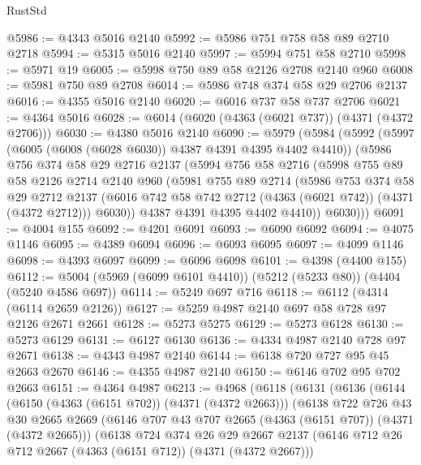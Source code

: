 \begin{lexlean}{RustStd}
\begin{coremodule}
@5986 := @4343 @5016 @2140
@5992 := @5986 @751 @758 @58 @89 @2710 @2718
@5994 := @5315 @5016 @2140
@5997 := @5994 @751 @58 @2710
@5998 := @5971 @19
@6005 := @5998 @750 @89 @58 @2126 @2708 @2140 @960
@6008 := @5981 @750 @89 @2708
@6014 := @5986 @748 @374 @58 @29 @2706 @2137
@6016 := @4355 @5016 @2140
@6020 := @6016 @737 @58 @737 @2706
@6021 := @4364 @5016
@6028 := @6014 (@6020 (@4363 (@6021 @737)) (@4371 (@4372 @2706)))
@6030 := @4380 @5016 @2140
@6090 := @5979
    (@5984
      (@5992
        (@5997 (@6005 (@6008 (@6028 @6030)) @4387 @4391 @4395 @4402 @4410))
        (@5986
          @756
          @374
          @58
          @29
          @2716
          @2137
          (@5994
            @756
            @58
            @2716
            (@5998
              @755
              @89
              @58
              @2126
              @2714
              @2140
              @960
              (@5981
                @755
                @89
                @2714
                (@5986
                  @753
                  @374
                  @58
                  @29
                  @2712
                  @2137
                  (@6016 @742 @58 @742 @2712 (@4363 (@6021 @742)) (@4371 (@4372 @2712)))
                  @6030))
              @4387
              @4391
              @4395
              @4402
              @4410))
          @6030)))
@6091 := @4004 @155
@6092 := @4201 @6091
@6093 := @6090 @6092
@6094 := @4075 @1146
@6095 := @4389 @6094
@6096 := @6093 @6095
@6097 := @4099 @1146
@6098 := @4393 @6097
@6099 := @6096 @6098
@6101 := @4398 (@4400 @155)
@6112 := @5004 (@5969 (@6099 @6101 @4410)) (@5212 (@5233 @80)) (@4404 (@5240 @4586 @697))
@6114 := @5249 @697 @716
@6118 := @6112 (@4314 (@6114 @2659 @2126))
@6127 := @5259 @4987 @2140 @697 @58 @728 @97 @2126 @2671 @2661
@6128 := @5273 @5275
@6129 := @5273 @6128
@6130 := @5273 @6129
@6131 := @6127 @6130
@6136 := @4334 @4987 @2140 @728 @97 @2671
@6138 := @4343 @4987 @2140
@6144 := @6138 @720 @727 @95 @45 @2663 @2670
@6146 := @4355 @4987 @2140
@6150 := @6146 @702 @95 @702 @2663
@6151 := @4364 @4987
@6213 := @4968
    (@6118
      (@6131
        (@6136
          (@6144
            (@6150 (@4363 (@6151 @702)) (@4371 (@4372 @2663)))
            (@6138
              @722
              @726
              @43
              @30
              @2665
              @2669
              (@6146 @707 @43 @707 @2665 (@4363 (@6151 @707)) (@4371 (@4372 @2665)))
              (@6138
                @724
                @374
                @26
                @29
                @2667
                @2137
                (@6146 @712 @26 @712 @2667 (@4363 (@6151 @712)) (@4371 (@4372 @2667)))

\end{coremodule}
\end{lexlean}
